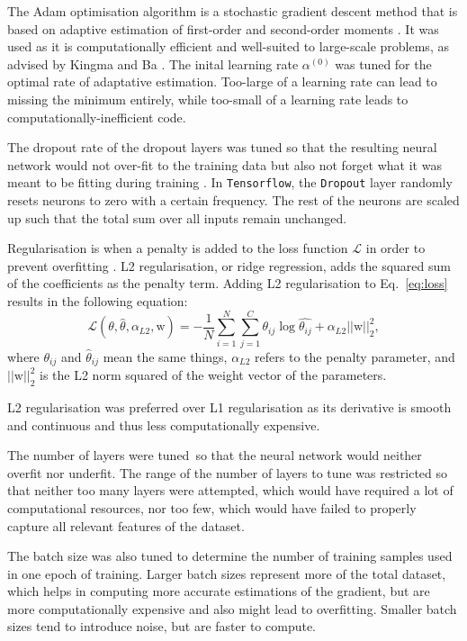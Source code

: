 \documentclass[11pt,a4paper]{article}
\begin{document}
The Adam optimisation algorithm is a stochastic gradient descent method that is based on adaptive estimation of first-order and second-order moments \citep{kingma2017adammethodstochasticoptimization}. It was used as it is computationally efficient and well-suited to large-scale problems, as advised by Kingma and Ba \citep{kingma2017adammethodstochasticoptimization}. The inital learning rate $\alpha^{(0)}$ was tuned for the optimal rate of adaptative estimation. Too-large of a learning rate can lead to missing the minimum entirely, while too-small of a learning rate leads to computationally-inefficient code.

The dropout rate of the dropout layers was tuned so that the resulting neural network would not over-fit to the training data but also not forget what it was meant to be fitting during training \citep{Mehta_2019}. In \texttt{Tensorflow}, the \texttt{Dropout} layer randomly resets neurons to zero with a certain frequency. The rest of the neurons are scaled up such that the total sum over all inputs remain unchanged.

Regularisation is when a penalty is added to the loss function $\mathcal{L}$ in order to prevent overfitting \citep{Mehta_2019}. L2 regularisation, or ridge regression, adds the squared sum of the coefficients as the penalty term. Adding L2 regularisation to Eq.~\ref{eq:loss} results in the following equation:
\begin{equation}
    \mathcal{L}(\theta, \hat{\theta}, \alpha_{L2}, \mathrm{w}) = - \frac{1}{N}\sum^N_{i=1}\sum^C_{j=1} \theta_{ij} \log{\hat{\theta_{ij}}} + \alpha_{L2} ||\mathrm{w}||^2_2,
\end{equation}
where $\theta_{ij}$ and $\hat{\theta}_{ij}$ mean the same things, $\alpha_{L2}$ refers to the penalty parameter, and $||\mathrm{w}||^2_2$ is the L2 norm squared of the weight vector of the parameters.

L2 regularisation was preferred over L1 regularisation as its derivative is smooth and continuous and thus less computationally expensive.

The number of layers were tuned so that the neural network would neither overfit nor underfit. The range of the number of layers to tune was restricted so that neither too many layers were attempted, which would have required a lot of computational resources, nor too few, which would have failed to properly capture all relevant features of the dataset.

The batch size was also tuned to determine the number of training samples used in one epoch of training. Larger batch sizes represent more of the total dataset, which helps in computing more accurate estimations of the gradient, but are more computationally expensive and also might lead to overfitting. Smaller batch sizes tend to introduce noise, but are faster to compute.
\end{document}
